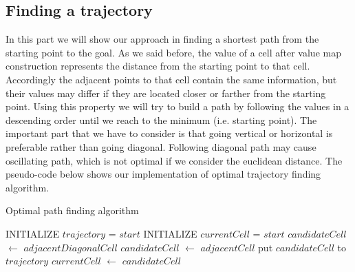 \documentclass[a4paper]{article}
\begin{document}
\subsection*{Finding a trajectory}
In this part we will show our approach in finding a shortest path from the starting point to the goal. As we said before, the value of a cell after value map construction represents the distance from the starting point to that cell. Accordingly the adjacent points to that cell contain the same information, but their values may differ if they are located closer or farther from the starting point. Using this property we will try to build a path by following the values in a descending order until we reach to the minimum (i.e. starting point). The important part that we have to consider is that going vertical or horizontal is preferable rather than going diagonal. Following diagonal path may cause oscillating path, which is not optimal if we consider the euclidean distance. The pseudo-code below shows our implementation of optimal trajectory finding algorithm.

\begin{algorithm}[H]
\caption{Optimal path finding algorithm}
\label{wfAlgo}
\begin{algorithmic}[1]
\STATE INITIALIZE $trajectory$ = $start$
\STATE INITIALIZE $currentCell$ = $start$
\REPEAT
{}
\STATE $candidateCell$ $\leftarrow$ $adjacentDiagonalCell$
\ENDIF
\ENDFOR
{}
\STATE $candidateCell$ $\leftarrow$ $adjacentCell$
\ENDIF
\ENDFOR
\STATE put $candidateCell$ to $trajectory$
\STATE $currentCell$ $\leftarrow$ $candidateCell$
\end{algorithmic}
\end{algorithm}
\end{document}
